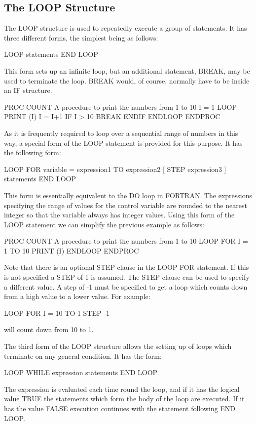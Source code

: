 \documentclass[twoside,11pt,nolof,chapters]{starlink}
\begin{document}
\subsection{The LOOP Structure}
The LOOP structure is used to repeatedly execute a group of statements. It has
three different forms, the simplest being as follows:
\begin{terminalv}
    LOOP
        statements
    END LOOP
\end{terminalv}
This form sets up an infinite loop, but an additional statement, BREAK, may
be used to terminate the loop. BREAK would, of course, normally have to
be inside an IF structure.
\begin{terminalv}
    PROC COUNT
        {  A procedure to print the numbers from 1 to 10  }
        I = 1
        LOOP
            PRINT (I)
            I = I+1
            IF I > 10
                BREAK
            ENDIF
        ENDLOOP
    ENDPROC
\end{terminalv}
As it is frequently required to loop over a sequential range of numbers in
this way, a special form of the LOOP statement is provided for this purpose.
It has the following form:
\begin{terminalv}
    LOOP FOR variable = expression1 TO expression2 [ STEP expression3 ]
        statements
    END LOOP
\end{terminalv}
This form is essentially equivalent to the DO loop in FORTRAN. The expressions
specifying the range of values for the control variable are rounded to the
nearest integer so that the variable always has integer values. Using this
form of the LOOP statement we can simplify the previous example as
follows:
\begin{terminalv}
    PROC COUNT
        {  A procedure to print the numbers from 1 to 10  }
        LOOP FOR I = 1 TO 10
            PRINT (I)
        ENDLOOP
    ENDPROC
\end{terminalv}
Note that there is an optional STEP clause in the LOOP FOR statement. If
this is not specified a STEP of 1 is assumed. The STEP clause can be used
to specify a different value. A step of -1 must be specified to get a loop
which counts down from a high value to a lower value. For example:
\begin{terminalv}
    LOOP FOR I = 10 TO 1 STEP -1
\end{terminalv}
will count down from 10 to 1.

The third form of the LOOP structure allows the setting up of loops which
terminate on any general condition. It has the form:
\begin{terminalv}
    LOOP WHILE expression
        statements
    END LOOP
\end{terminalv}
The expression is evaluated each time round the loop, and if it has the logical
value TRUE the statements which form the body of the loop are executed. If
it has the value FALSE execution continues with the statement following
END LOOP.
\end{document}
